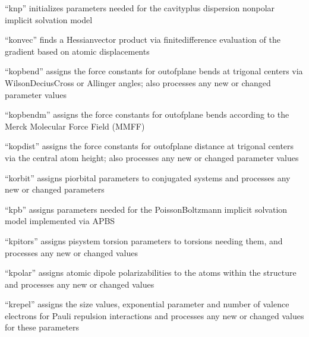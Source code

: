 \documentclass[letterpaper,11pt,english]{sphinxmanual}
\begin{document}

“knp” initializes parameters needed for the cavity\sphinxhyphen{}plus\sphinxhyphen{}
dispersion nonpolar implicit solvation model


“konvec” finds a Hessian\sphinxhyphen{}vector product via finite\sphinxhyphen{}difference
evaluation of the gradient based on atomic displacements


“kopbend” assigns the force constants for out\sphinxhyphen{}of\sphinxhyphen{}plane bends
at trigonal centers via Wilson\sphinxhyphen{}Decius\sphinxhyphen{}Cross or Allinger angles;
also processes any new or changed parameter values


“kopbendm” assigns the force constants for out\sphinxhyphen{}of\sphinxhyphen{}plane bends
according to the Merck Molecular Force Field (MMFF)


“kopdist” assigns the force constants for out\sphinxhyphen{}of\sphinxhyphen{}plane
distance at trigonal centers via the central atom height;
also processes any new or changed parameter values


“korbit” assigns pi\sphinxhyphen{}orbital parameters to conjugated systems
and processes any new or changed parameters


“kpb” assigns parameters needed for the Poisson\sphinxhyphen{}Boltzmann
implicit solvation model implemented via APBS


“kpitors” assigns pi\sphinxhyphen{}system torsion parameters to torsions
needing them, and processes any new or changed values


“kpolar” assigns atomic dipole polarizabilities to the atoms
within the structure and processes any new or changed values


“krepel” assigns the size values, exponential parameter and
number of valence electrons for Pauli repulsion interactions
and processes any new or changed values for these parameters
\end{document}
